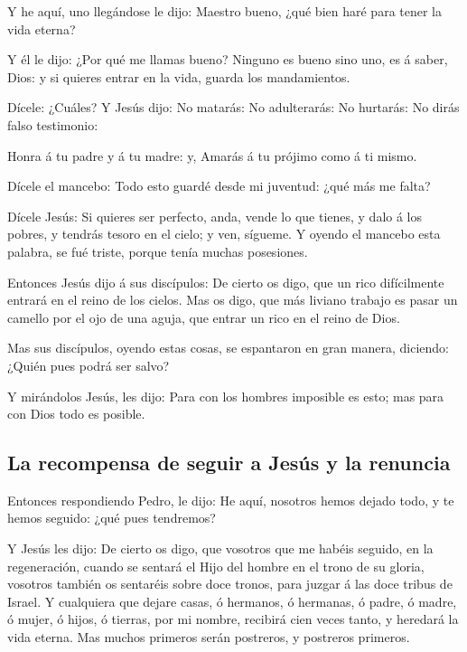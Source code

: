  Y he aquí, uno llegándose le dijo: Maestro bueno, ¿qué
bien haré para tener la vida eterna?

 Y él le dijo: ¿Por qué me llamas bueno? Ninguno es bueno
sino uno, es á saber, Dios: y si quieres entrar en la vida, guarda los
mandamientos.

 Dícele: ¿Cuáles? Y Jesús dijo: No matarás: No
adulterarás: No hurtarás: No dirás falso testimonio:

 Honra á tu padre y á tu madre: y, Amarás á tu prójimo
como á ti mismo.

 Dícele el mancebo: Todo esto guardé desde mi juventud:
¿qué más me falta?

 Dícele Jesús: Si quieres ser perfecto, anda, vende lo
que tienes, y dalo á los pobres, y tendrás tesoro en el cielo; y ven,
sígueme.  Y oyendo el mancebo esta palabra, se fué
triste, porque tenía muchas posesiones.

 Entonces Jesús dijo á sus discípulos: De cierto os digo,
que un rico difícilmente entrará en el reino de los cielos.
 Mas os digo, que más liviano trabajo es pasar un camello
por el ojo de una aguja, que entrar un rico en el reino de Dios.

 Mas sus discípulos, oyendo estas cosas, se espantaron en
gran manera, diciendo: ¿Quién pues podrá ser salvo?

 Y mirándolos Jesús, les dijo: Para con los hombres
imposible es esto; mas para con Dios todo es posible.

\hypertarget{la-recompensa-de-seguir-a-jesuxfas-y-la-renuncia}{%
\subsection{La recompensa de seguir a Jesús y la
renuncia}\label{la-recompensa-de-seguir-a-jesuxfas-y-la-renuncia}}

 Entonces respondiendo Pedro, le dijo: He aquí, nosotros
hemos dejado todo, y te hemos seguido: ¿qué pues tendremos?

 Y Jesús les dijo: De cierto os digo, que vosotros que me
habéis seguido, en la regeneración, cuando se sentará el Hijo del hombre
en el trono de su gloria, vosotros también os sentaréis sobre doce
tronos, para juzgar á las doce tribus de Israel.  Y
cualquiera que dejare casas, ó hermanos, ó hermanas, ó padre, ó madre, ó
mujer, ó hijos, ó tierras, por mi nombre, recibirá cien veces tanto, y
heredará la vida eterna.  Mas muchos primeros serán
postreros, y postreros primeros.

